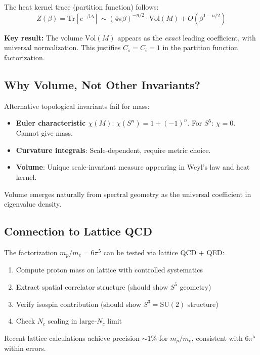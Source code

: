 The heat kernel trace (partition function) follows:
\begin{equation}
Z(\beta) = \text{Tr}[e^{-\beta \Delta}] \sim (4\pi\beta)^{-n/2} \cdot \text{Vol}(M) + O(\beta^{1-n/2})
\end{equation}

\textbf{Key result:} The volume $\text{Vol}(M)$ appears as the \emph{exact} leading coefficient, with universal normalization. This justifies $C_s = C_i = 1$ in the partition function factorization.

\subsection{Why Volume, Not Other Invariants?}

Alternative topological invariants fail for mass:
\begin{itemize}
    \item \textbf{Euler characteristic $\chi(M)$}: $\chi(S^n) = 1 + (-1)^n$. For $S^5$: $\chi = 0$. Cannot give mass.
    \item \textbf{Curvature integrals}: Scale-dependent, require metric choice.
    \item \textbf{Volume}: Unique scale-invariant measure appearing in Weyl's law and heat kernel.
\end{itemize}

Volume emerges naturally from spectral geometry as the universal coefficient in eigenvalue density.

\subsection{Connection to Lattice QCD}

The factorization $m_p/m_e = 6\pi^5$ can be tested via lattice QCD + QED:
\begin{enumerate}
    \item Compute proton mass on lattice with controlled systematics
    \item Extract spatial correlator structure (should show $S^5$ geometry)
    \item Verify isospin contribution (should show $S^3 = \text{SU}(2)$ structure)
    \item Check $N_c$ scaling in large-$N_c$ limit
\end{enumerate}

Recent lattice calculations achieve precision $\sim 1\%$ for $m_p/m_e$, consistent with $6\pi^5$ within errors.

